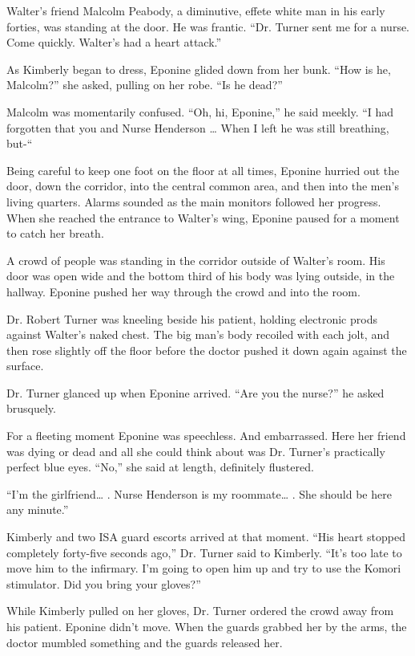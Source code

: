 \documentclass[]{article}
\begin{document}
{Walter’s friend Malcolm Peabody, a diminutive, effete white man in his early forties, was standing at the door. He was frantic. “Dr. Turner sent me for a nurse. Come quickly. Walter’s had a heart attack.”

As Kimberly began to dress, Eponine glided down from her bunk. “How is he, Malcolm?” she asked, pulling on her robe. “Is he dead?”

Malcolm was momentarily confused. “Oh, hi, Eponine,” he said meekly. “I had forgotten that you and Nurse Henderson … When I left he was still breathing, but-“

Being careful to keep one foot on the floor at all times, Eponine hurried out the door, down the corridor, into the central common area, and then into the men’s living quarters. Alarms sounded as the main monitors followed her progress. When she reached the entrance to Walter’s wing, Eponine paused for a moment to catch her breath.

A crowd of people was standing in the corridor outside of Walter’s room. His door was open wide and the bottom third of his body was lying outside, in the hallway. Eponine pushed her way through the crowd and into the room.

Dr. Robert Turner was kneeling beside his patient, holding electronic prods against Walter’s naked chest. The big man’s body recoiled with each jolt, and then rose slightly off the floor before the doctor pushed it down again against the surface.

Dr. Turner glanced up when Eponine arrived. “Are you the nurse?” he asked brusquely.

For a fleeting moment Eponine was speechless. And embarrassed. Here her friend was dying or dead and all she could think about was Dr. Turner’s practically perfect blue eyes. “No,” she said at length, definitely flustered.

“I’m the girlfriend… . Nurse Henderson is my roommate… . She should be here any minute.”

Kimberly and two ISA guard escorts arrived at that moment. “His heart stopped completely forty-five seconds ago,” Dr. Turner said to Kimberly. “It’s too late to move him to the infirmary. I’m going to open him up and try to use the Komori stimulator. Did you bring your gloves?”

While Kimberly pulled on her gloves, Dr. Turner ordered the crowd away from his patient. Eponine didn’t move. When the guards grabbed her by the arms, the doctor mumbled something and the guards released her.

}
\end{document}
